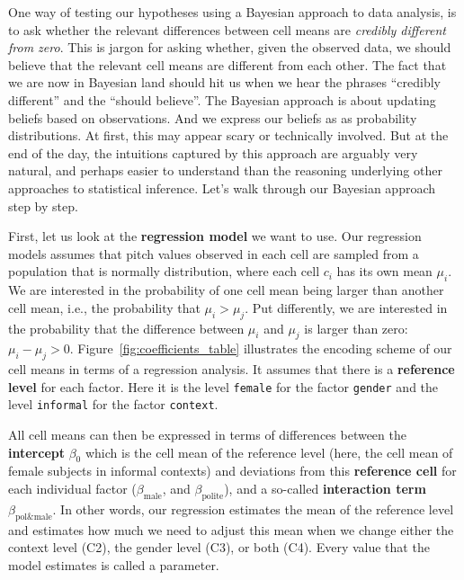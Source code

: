 \documentclass[nobib]{tufte-handout}
\newcommand{\tr}[1]{\textcolor{DarkOrange}{[tr: #1]}}
\begin{document}
One way of testing our hypotheses using a Bayesian approach to data analysis, is to ask whether the relevant differences between cell means are \textit{credibly different from zero}. This is  jargon for asking whether, given the observed data, we should believe that the relevant cell means are different from each other. The fact that we are now in Bayesian land should hit us when we hear the phrases ``credibly different'' and the ``should believe''. The Bayesian approach is about  updating beliefs based on observations. And we express our beliefs as as probability distributions. 
At first, this may appear scary or technically involved. But at the end of the day, the intuitions captured by this approach are arguably very natural, and perhaps easier to understand than the reasoning underlying other approaches to statistical inference. Let's walk through our Bayesian approach step by step.

First, let us look at the \textbf{regression model} we want to use.
Our regression models assumes that pitch values observed in each cell are
sampled from a population that is normally distribution, where each cell $c_i$ has its own mean $\mu_i$. We are interested in the probability of one cell mean being larger than
another cell mean, i.e., the probability that $\mu_i > \mu_j$. Put differently, we are interested in the probability that the difference between $\mu_i$ and $\mu_j$ is larger than zero: $\mu_i - \mu_j > 0$.
Figure~\ref{fig:coefficients_table} illustrates the encoding scheme of our cell means in terms of a regression analysis. It assumes that
there is a \textbf{reference level} for each factor. Here it is the level \texttt{female} for
the factor \texttt{gender} and the level \texttt{informal} for the factor
\texttt{context}. 
  
All cell means can then be expressed in terms of
differences between the \textbf{intercept} $\beta_0$ which is the cell mean of the reference level (here, the cell mean of female subjects in
informal contexts) and deviations from this \textbf{reference cell} for each individual factor
($\beta_{\text{male}}$, and $\beta_{\text{polite}}$), and a so-called \textbf{interaction term}
$\beta_{\text{pol\&male}}$. In other words, our regression estimates the mean of the reference level and estimates how much we need to adjust this mean when we change either the context level (C2), the gender level (C3), or both (C4). Every value that the model estimates is called a parameter.
\end{document}
